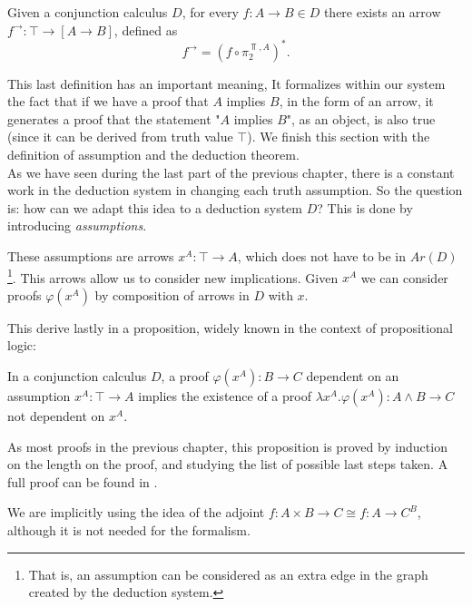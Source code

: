 \begin{definition}
  Given a conjunction calculus $D$, for every $f:A\to B \in D$ there exists an arrow $f^\to: \top \to [A\to B]$, defined as 
  $$f^\to = \left(f\circ \pi_2^{\Top,A}\right)^*.$$
\end{definition}

This last definition has an important meaning, It formalizes within our system the fact that if we have a proof that $A$ implies $B$, in the form of an arrow, it generates a proof that the statement "$A$ implies $B$", as an object, is also true (since it can be derived from truth value $\top$). We finish this section with the definition of assumption and the deduction theorem.\\

As we have seen during the last part of the previous chapter, there is a constant work in the deduction system in changing each truth assumption. So the question is: how can we adapt this idea to a deduction system $D$? This is done by introducing \emph{assumptions}.

\begin{definition}
These assumptions are arrows $x^A: \top \to A$, which does not have to be in $Ar(D)$\footnote{That is, an assumption can be considered as an extra edge in the graph created by the deduction system.}. This arrows allow us to consider new implications. Given $x^A$ we can consider proofs $\varphi(x^A)$ by composition of arrows in $D$ with $x$.
\end{definition}
This derive lastly in  a proposition, widely known in the context of propositional logic:

\begin{theorem}\label{deduction-theorem}
  In a conjunction calculus $D$, a proof $\varphi(x^A): B \to C$ dependent on an assumption $x^A: \top \to A$ implies the existence of a proof $\lambda x^A.\varphi (x^A): A\land B \to C$ not dependent on $x^A$.
\end{theorem}
\begin{sproof}
  As most proofs in the previous chapter, this proposition is proved by induction on the length on the proof, and studying the list of possible last steps taken. A full proof can be found in \cite[proposition 2.1]{lambek1988introduction}.
\end{sproof}
 We are implicitly using the idea of the adjoint $f:A\times B \to C \cong f: A \to C^B$, although it is not needed for the formalism.





